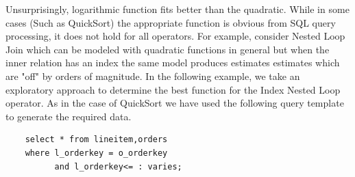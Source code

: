 \documentclass{article}
\begin{document}
\begin{multicols}{2}
	Unsurprisingly, logarithmic function fits better than the quadratic. 
	While in some cases (Such as QuickSort) the appropriate function is obvious from SQL
	query processing, it does not hold for all operators. 
	For example, consider Nested Loop Join which 
	can be modeled with quadratic functions in general but when the inner relation has an index 
	the same model produces estimates estimates which are 
	"off" by orders of magnitude. In the following example,
	we take an exploratory approach to determine the best function for the Index Nested Loop operator.
	As in the case of QuickSort we have used the following query template to generate the required
	data.
	
	\begin{framed}
	\begin{verbatim}
	select * from lineitem,orders
	where l_orderkey = o_orderkey 
		  and l_orderkey<= : varies;
	\end{verbatim}
	\end{framed}
	

\end{multicols}
\end{document}
